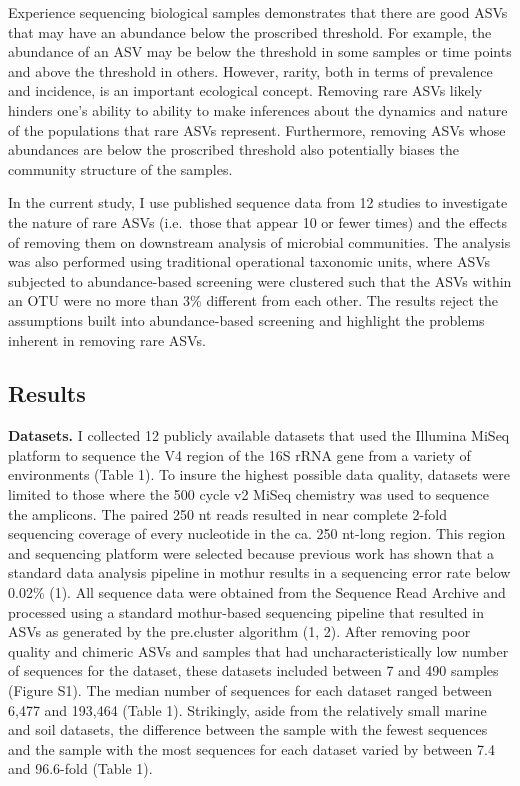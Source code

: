 \documentclass[]{article}
\begin{document}
Experience sequencing biological samples demonstrates that there are
good ASVs that may have an abundance below the proscribed threshold. For
example, the abundance of an ASV may be below the threshold in some
samples or time points and above the threshold in others. However,
rarity, both in terms of prevalence and incidence, is an important
ecological concept. Removing rare ASVs likely hinders one's ability to
ability to make inferences about the dynamics and nature of the
populations that rare ASVs represent. Furthermore, removing ASVs whose
abundances are below the proscribed threshold also potentially biases
the community structure of the samples.

In the current study, I use published sequence data from 12 studies to
investigate the nature of rare ASVs (i.e.~those that appear 10 or fewer
times) and the effects of removing them on downstream analysis of
microbial communities. The analysis was also performed using traditional
operational taxonomic units, where ASVs subjected to abundance-based
screening were clustered such that the ASVs within an OTU were no more
than 3\% different from each other. The results reject the assumptions
built into abundance-based screening and highlight the problems inherent
in removing rare ASVs.

\subsection{Results}\label{results}

\textbf{Datasets.} I collected 12 publicly available datasets that used
the Illumina MiSeq platform to sequence the V4 region of the 16S rRNA
gene from a variety of environments (Table 1). To insure the highest
possible data quality, datasets were limited to those where the 500
cycle v2 MiSeq chemistry was used to sequence the amplicons. The paired
250 nt reads resulted in near complete 2-fold sequencing coverage of
every nucleotide in the ca. 250 nt-long region. This region and
sequencing platform were selected because previous work has shown that a
standard data analysis pipeline in mothur results in a sequencing error
rate below 0.02\% (1). All sequence data were obtained from the Sequence
Read Archive and processed using a standard mothur-based sequencing
pipeline that resulted in ASVs as generated by the pre.cluster algorithm
(1, 2). After removing poor quality and chimeric ASVs and samples that
had uncharacteristically low number of sequences for the dataset, these
datasets included between 7 and 490 samples (Figure S1). The median
number of sequences for each dataset ranged between 6,477 and 193,464
(Table 1). Strikingly, aside from the relatively small marine and soil
datasets, the difference between the sample with the fewest sequences
and the sample with the most sequences for each dataset varied by
between 7.4 and 96.6-fold (Table 1).
\end{document}
